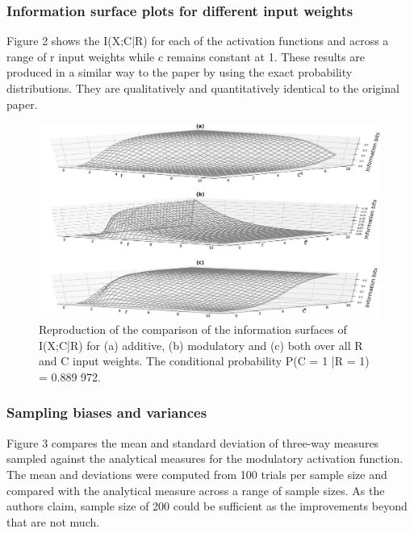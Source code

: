 \subsubsection{Information surface plots for different input weights}

Figure 2 shows the I(X;C|R) for each of the activation functions and across a range of r input weights while c remains constant at 1. These results are produced in a similar way to the paper by using the exact probability distributions. They are qualitatively and quantitatively identical to the original paper.


\begin{figure}[H]
    \includegraphics[width=\textwidth]{figure_2.png}
      \caption{Reproduction of the comparison of the information surfaces of I(X;C|R) for (a) additive, (b) modulatory and (c) both over all R and C input weights. The conditional probability P(C = 1 |R = 1) = 0.889 972.}
\end{figure}

\subsubsection{Sampling biases and variances}

Figure 3 compares the mean and standard deviation of three-way measures sampled against the analytical measures for the modulatory activation function. The mean and deviations were computed from 100 trials per sample size and compared with the analytical measure across a range of sample sizes. As the authors claim, sample size of 200 could be sufficient as the improvements beyond that are not much.



